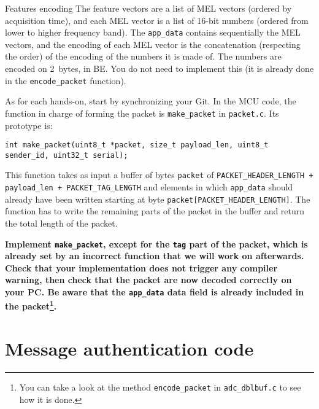 \begin{bclogo}[couleur = gray!20, arrondi = 0.2, logo=\bcinfo]{Features encoding}
    The feature vectors are a list of MEL vectors (ordered by acquisition
    time), and each MEL vector is a list of 16-bit numbers (ordered from lower
    to higher frequency band).
    The \texttt{app\_data} contains sequentially the MEL vectors, and the
    encoding of each MEL vector is the concatenation (respecting the order) of
    the encoding of the numbers it is made of.  The numbers are encoded on
    2~bytes, in BE.
    You do not need to implement this (it is already done in the \verb|encode_packet| function).
\end{bclogo}

As for each hands-on, start by synchronizing your Git. In the MCU code, the function in charge of forming the packet is
\verb|make_packet| in \texttt{packet.c}.
Its prototype is:
\begin{lstlisting}[style=customc]
int make_packet(uint8_t *packet, size_t payload_len, uint8_t sender_id, uint32_t serial);
\end{lstlisting}
This function takes as input a buffer of bytes \texttt{packet} of
\texttt{PACKET\_HEADER\_LENGTH + payload\_len + PACKET\_TAG\_LENGTH} and elements in
which \texttt{app\_data} should already have been written starting at byte
\verb|packet[PACKET_HEADER_LENGTH]|.
The function has to write the remaining parts of the packet in the buffer and
return the total length of the packet.

\textbf{
    Implement \texttt{make\_packet}, except for the \texttt{tag} part of the
    packet, which is already set by an incorrect function that we will work on afterwards.
    Check that your implementation does not trigger any compiler warning, then
    check that the packet are now decoded correctly on your PC. Be aware that the \texttt{app\_data} data field is already included in the packet\footnote{You can take a look at the method \texttt{encode\_packet} in \texttt{adc\_dblbuf.c} to see how it is done.}.
}

\section{Message authentication code}


